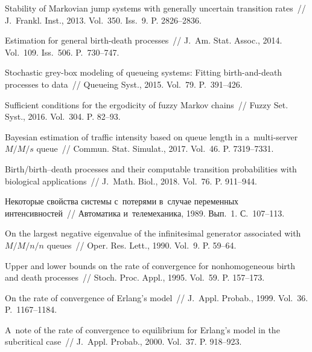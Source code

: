 \begin{multicols}{2}
{\small\frenchspacing
 {%
 \begin{thebibliography}{99}
 
  Stability of Markovian jump systems with
generally uncertain transition rates~// J.~Frankl.
Inst., 2013. Vol.~350. Iss.~9. P. 2826--2836.

Estimation for general birth-death processes~// 
J.~Am. Stat. Assoc., 2014. Vol.~109. Iss.~506. P.~730--747.

 Stochastic grey-box modeling of queueing systems:
Fitting birth-and-death processes to data~// Queueing Syst., 2015.
Vol.~79. P.~391--426.

Sufficient conditions for the ergodicity of fuzzy Markov chains~// 
Fuzzy Set.  Syst., 2016. Vol.~304. P. 82--93.

  Bayesian estimation of
traffic intensity based on queue length in a~multi-server $M/M/s$
queue~// Commun. Stat. Simulat.,
2017. Vol.~46. P. 7319--7331.



Birth/birth--death processes and their computable transition probabilities 
with biological applications~// J.~Math. Biol.,  2018. Vol.~76. P. 911--944.



  Некоторые свойства системы с~потерями в~случае
переменных интенсивностей~// Автоматика и~телемеханика, 1989.
Вып.~1. С.~107--113.

 On the largest negative eigenvalue of the
infinitesimal generator associated with $M/M/n/n$ queues~//
Oper.  Res. Lett.,  1990. Vol.~9. P. 59--64.

  Upper and lower bounds on the
rate of convergence for nonhomogeneous birth and death processes~//
Stoch.  Proc. Appl.,  1995. Vol.~59. P.
157--173.

On the rate of convergence of Erlang's model~//
 J.~Appl. Probab., 1999. Vol.~36. P.~1167--1184.

  A~note of the rate of convergence to equilibrium
 for Erlang's model in the subcritical case~//  J.~Appl.
  Probab., 2000. Vol.~37. P. 918--923.


\end{thebibliography}}}
\end{multicols}
